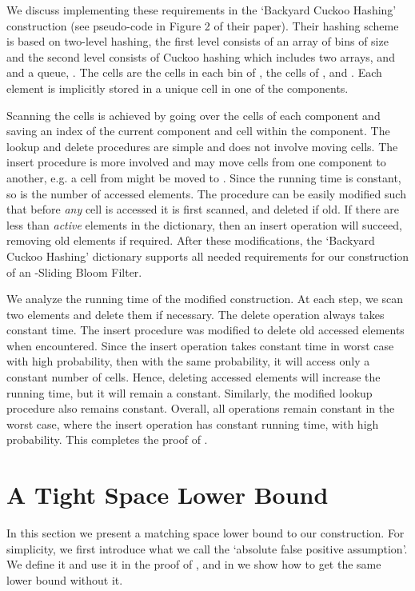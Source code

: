 \documentclass[11pt]{article}
\begin{document}
We discuss implementing these requirements in the `Backyard Cuckoo Hashing' construction (see pseudo-code in Figure 2 of their paper). Their hashing scheme is based on two-level hashing, the first level consists of an array  of bins of size  and the second level consists of Cuckoo hashing which includes two arrays,  and  and a queue, . The cells are the  cells in each bin of , the cells of ,  and . Each element is implicitly stored in a unique cell in one of the components.

Scanning the cells is achieved by going over the cells of each component and saving an index of the current component and cell within the component. The lookup and delete procedures are simple and does not involve moving cells. The insert procedure is more involved and may move cells from one component to another, e.g. a cell from  might be moved to . Since the running time is constant, so is the number of accessed elements. The procedure can be easily modified such that before \emph{any} cell is accessed it is first scanned, and deleted if old. If there are less than  \emph{active} elements in the dictionary, then an insert operation will succeed, removing old elements if required. After these modifications, the `Backyard Cuckoo Hashing' dictionary supports all needed requirements for our construction of an -Sliding Bloom Filter.

We analyze the running time of the modified construction. At each step, we scan two elements and delete them if necessary. The delete operation always takes constant time. The insert procedure was modified to delete old accessed elements when encountered. Since the insert operation takes constant time in worst case with high probability, then with the same probability, it will access only a constant number of cells. Hence, deleting accessed elements will increase the running time, but it will remain a constant. Similarly, the modified lookup procedure also remains constant. Overall, all operations remain constant in the worst case, where the insert operation has constant running time, with high probability. This completes the proof of .


\section{A Tight Space Lower Bound}\label{sec:lowebound}
In this section we present a matching space lower bound to our construction. For simplicity, we first introduce what we call the `absolute false positive assumption'. We define it and use it in the proof of , and in  we show how to get the same lower bound without it.
\end{document}
